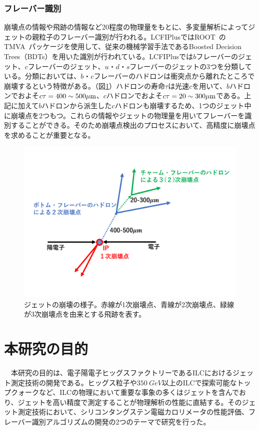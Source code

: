 \subsubsection{フレーバー識別}
崩壊点の情報や飛跡の情報など20程度の物理量をもとに、多変量解析によってジェットの親粒子のフレーバー識別が行われる。LCFIPlusではROOT~\cite{root}のTMVA~\cite{tmva}パッケージを使用して、従来の機械学習手法であるBoosted Decision Trees（BDTs）を用いた識別が行われている。LCFIPlusでは$b$フレーバーのジェット、$c$フレーバーのジェット、$u$・$d$・$s$フレーバーのジェットの3つを分類している。分類においては、$b$・$c$フレーバーのハドロンは衝突点から離れたところで崩壊するという特徴がある。（図\ref{bcjets}）ハドロンの寿命$\tau$は光速$c$を用いて、$b$ハドロンでおよそ$c \tau = 400 \sim 500 \mu \rm{m}$、$c$ハドロンでおよそ$c\tau = 20 \sim 300 \mu \rm{m}$である。上記に加えて$b$ハドロンから派生した$c$ハドロンも崩壊するため、1つのジェット中に崩壊点を2つもつ。これらの情報やジェットの物理量を用いてフレーバーを識別することができる。そのため崩壊点検出のプロセスにおいて、高精度に崩壊点を求めることが重要となる。
\begin{figure}[H]
	\begin{center}
 \includegraphics[keepaspectratio, scale=0.4]
 	{Figure/Introduction/bcjets.pdf}
 		\caption[ジェット崩壊の様子]{ジェットの崩壊の様子。赤線が1次崩壊点、青線が2次崩壊点、緑線が3次崩壊点を由来とする飛跡を表す。}
 		\label{bcjets}
	\end{center}
\end{figure}
\section{本研究の目的}
　本研究の目的は、電子陽電子ヒッグスファクトリーであるILCにおけるジェット測定技術の開発である。ヒッグス粒子や$\SI{350}{GeV}$以上のILCで探索可能なトップクォークなど、ILCの物理において重要な事象の多くはジェットを含んでおり、ジェットを高い精度で測定することが物理解析の性能に直結する。そのジェット測定技術において、シリコンタングステン電磁カロリメータの性能評価、フレーバー識別アルゴリズムの開発の2つのテーマで研究を行った。\\
